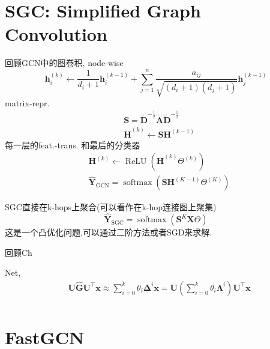 \documentclass{article}
\begin{document}
\section{SGC: Simplified Graph Convolution}

    回顾GCN中的图卷积, node-wise
    \begin{equation}
        \mathbf{h}_{i}^{(k)} \leftarrow \frac{1}{d_{i}+1} \mathbf{h}_{i}^{(k-1)}+\sum_{j=1}^{n} \frac{a_{i j}}{\sqrt{\left(d_{i}+1\right)\left(d_{j}+1\right)}} \mathbf{h}_{j}^{(k-1)}
    \end{equation}
    matrix-repr.
    \begin{equation}
        \begin{aligned}
        &\mathbf{S}=\tilde{\mathbf{D}}^{-\frac{1}{2}} \tilde{\mathbf{A}} \tilde{\mathbf{D}}^{-\frac{1}{2}}\\
        &\overline{\mathbf{H}}^{(k)} \leftarrow \mathbf{S H}^{(k-1)}
        \end{aligned}
    \end{equation}
    每一层的feat.-trans. 和最后的分类器
    \begin{equation}
        \begin{aligned}
            &\mathbf{H}^{(k)} \leftarrow \operatorname{ReLU}\left(\overline{\mathbf{H}}^{(k)} \Theta^{(k)}\right)\\  
            &\hat{\mathbf{Y}}_{\mathrm{GCN}}=\operatorname{softmax}\left(\mathbf{S H}^{(K-1)} \Theta^{(K)}\right)
        \end{aligned}
    \end{equation}

    SGC直接在k-hops上聚合(可以看作在k-hop连接图上聚集)
    \begin{equation}
        \hat{\mathbf{Y}}_{\mathrm{SGC}}=\operatorname{softmax}\left(\mathbf{S}^{K} \mathbf{X} \Theta\right)
    \end{equation}
    这是一个凸优化问题,可以通过二阶方法或者SGD来求解.

    回顾Ch
    
    Net, 
    \begin{align}
        &\mathbf{U} \hat{\mathbf{G}} \mathbf{U}^{\top} \mathbf{x} \approx \sum_{i=0}^{k} \theta_{i} \boldsymbol{\Delta}^{i} \mathbf{x}=\mathbf{U}\left(\sum_{i=0}^{k} \theta_{i} \mathbf{\Lambda}^{i}\right) \mathbf{U}^{\top} \mathbf{x}\\
    \end{align}
    
\section{FastGCN}
\end{document}
